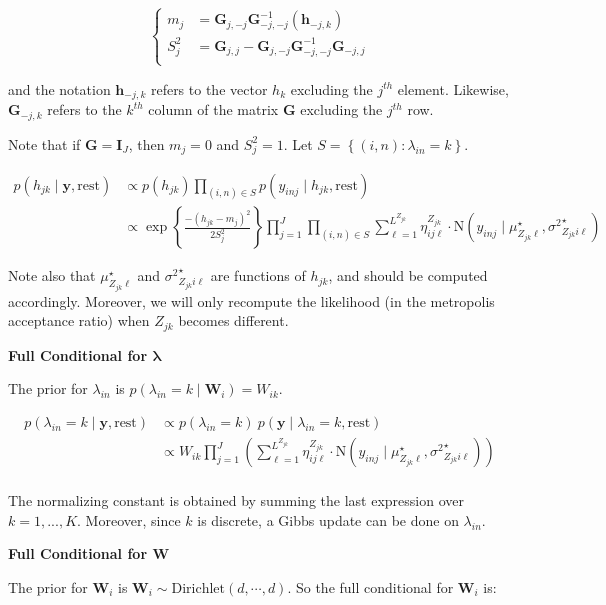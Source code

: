 \documentclass[12pt,]{article}
\newcommand{\p}[1]{\left(#1\right)}
\newcommand{\bc}[1]{ \left\{#1\right\} }
\newcommand{\N}{ \mathcal{N} }
\newcommand{\I}{\mathrm{\mathbf{I}}}
\def\N{\text{N}}
\def\Dir{\text{Dirichlet}}
\def\lin{\lambda_{in}}
\def\y{\bm{y}}
\def\mus{\mu^\star}
\def\sss{{\sigma^2}^\star}
\def\rest{\text{rest}}
\def\h{\bm{h}}
\begin{document}
\[
\begin{cases}
m_j &= \bm G_{j,-j} \bm G_{-j,-j}^{-1}(\h_{-j,k})\\
S_j^2 &= \bm G_{j,j} - \bm G_{j,-j}\bm G_{-j,-j}^{-1}\bm G_{-j,j}\\
\end{cases}
\]

and the notation \(\h_{-j,k}\) refers to the vector \(h_k\) excluding
the \(j^{th}\) element. Likewise, \(\bm G_{-j,k}\) refers to the
\(k^{th}\) column of the matrix \(\bm G\) excluding the \(j^{th}\) row.

Note that if \(\bm G = \I_J\), then \(m_j=0\) and \(S_j^2 = 1\). Let
\(S = \bc{(i,n)\colon \lin=k}\).

\begin{align*}
p(h_{jk} \mid \y, \rest)  &\propto p(h_{jk}) \prod_{(i,n) \in S} p(y_{inj} \mid
  h_{jk}, \rest) \\
%
&\propto
\exp\bc{\frac{-(h_{jk} - m_j)^2}{2S_j^2}}
 \prod_{j=1}^J \prod_{(i,n)\in S}
\sum_{\ell=1}^{L^{Z_{jk}}} \eta^{Z_{jk}}_{ij\ell} \cdot
\N(y_{inj} \mid \mus_{Z_{jk}\ell}, \sss_{Z_{jk}i\ell})
\end{align*}


Note also that \(\mus_{Z_{jk}\ell}\) and \(\sss_{Z_{jk}i\ell}\) are
functions of \(h_{jk}\), and should be computed accordingly. Moreover,
we will only recompute the likelihood (in the metropolis acceptance
ratio) when \(Z_{jk}\) becomes different.  
\vspace{2em}


\textbf{Full Conditional for $\bm \lambda$}

The prior for \(\lin\) is \(p(\lin = k \mid \bm W_i) = W_{ik}\).

\begin{align*}
p(\lin=k\mid \y,\rest) &\propto p(\lin=k) ~ p(\y \mid \lin=k, \rest) \\
&\propto W_{ik}
\prod_{j=1}^J 
\p{
  \sum_{\ell=1}^{L^{Z_{jk}}} \eta^{Z_{jk}}_{ij\ell} \cdot
  \N(y_{inj} \mid 
  \mus_{Z_{jk}\ell}, \sss_{Z_{jk}i\ell})
}\\
\end{align*}

The normalizing constant is obtained by summing the last expression over
\(k = 1,...,K\). Moreover, since \(k\) is discrete, a Gibbs update can
be done on \(\lin\).

\textbf{Full Conditional for $\bm W$}

The prior for \(\bm{W}_i\) is \(\bm W_i \sim \Dir(d, \cdots, d)\). So
the full conditional for \(\bm{W}_i\) is:
\end{document}
